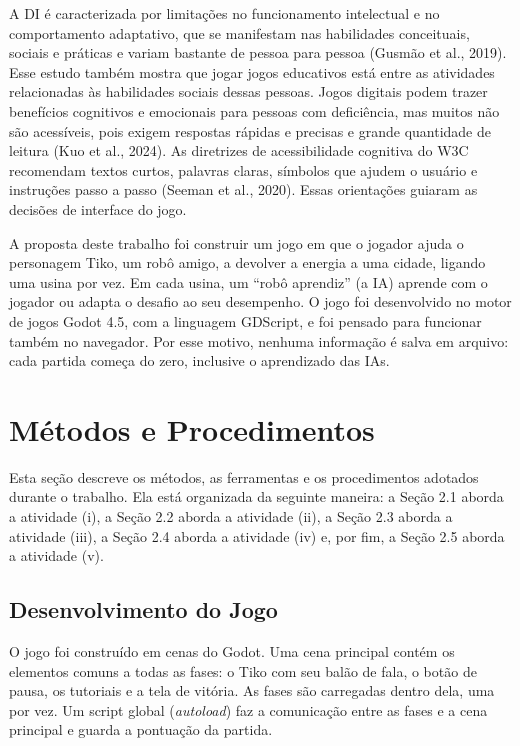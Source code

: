 \documentclass[12pt,a4paper]{article}
\begin{document}
A DI é caracterizada por limitações no funcionamento intelectual e no comportamento adaptativo, que se manifestam nas habilidades conceituais, sociais e práticas e variam bastante de pessoa para pessoa (Gusmão et al., 2019). Esse estudo também mostra que jogar jogos educativos está entre as atividades relacionadas às habilidades sociais dessas pessoas. Jogos digitais podem trazer benefícios cognitivos e emocionais para pessoas com deficiência, mas muitos não são acessíveis, pois exigem respostas rápidas e precisas e grande quantidade de leitura (Kuo et al., 2024). As diretrizes de acessibilidade cognitiva do W3C recomendam textos curtos, palavras claras, símbolos que ajudem o usuário e instruções passo a passo (Seeman et al., 2020). Essas orientações guiaram as decisões de interface do jogo.

A proposta deste trabalho foi construir um jogo em que o jogador ajuda o personagem Tiko, um robô amigo, a devolver a energia a uma cidade, ligando uma usina por vez. Em cada usina, um ``robô aprendiz'' (a IA) aprende com o jogador ou adapta o desafio ao seu desempenho. O jogo foi desenvolvido no motor de jogos Godot 4.5, com a linguagem GDScript, e foi pensado para funcionar também no navegador. Por esse motivo, nenhuma informação é salva em arquivo: cada partida começa do zero, inclusive o aprendizado das IAs.

\section{Métodos e Procedimentos}

Esta seção descreve os métodos, as ferramentas e os procedimentos adotados durante o trabalho. Ela está organizada da seguinte maneira: a Seção 2.1 aborda a atividade (i), a Seção 2.2 aborda a atividade (ii), a Seção 2.3 aborda a atividade (iii), a Seção 2.4 aborda a atividade (iv) e, por fim, a Seção 2.5 aborda a atividade (v).

\subsection{Desenvolvimento do Jogo}

O jogo foi construído em cenas do Godot. Uma cena principal contém os elementos comuns a todas as fases: o Tiko com seu balão de fala, o botão de pausa, os tutoriais e a tela de vitória. As fases são carregadas dentro dela, uma por vez. Um script global (\textit{autoload}) faz a comunicação entre as fases e a cena principal e guarda a pontuação da partida.
\end{document}
